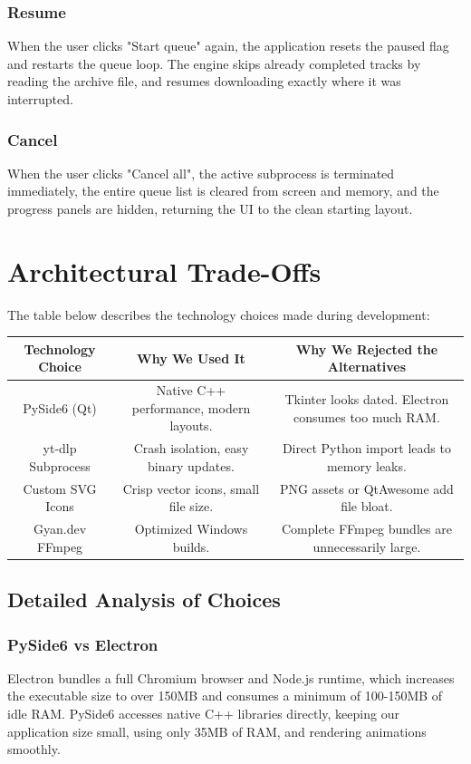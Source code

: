 \documentclass[12pt]{report}
\begin{document}
\subsection{Resume}
When the user clicks "Start queue" again, the application resets the paused flag and restarts the queue loop. The engine skips already completed tracks by reading the archive file, and resumes downloading exactly where it was interrupted.

\subsection{Cancel}
When the user clicks "Cancel all", the active subprocess is terminated immediately, the entire queue list is cleared from screen and memory, and the progress panels are hidden, returning the UI to the clean starting layout.

\newpage
\chapter{Architectural Trade-Offs}

The table below describes the technology choices made during development:

\vspace{10pt}
\renewcommand{\arraystretch}{1.5}
\begin{tabularx}{\textwidth}{|C|C|C|}
\hline
\textbf{Technology Choice} & \textbf{Why We Used It} & \textbf{Why We Rejected the Alternatives} \\ \hline
PySide6 (Qt) & Native C++ performance, modern layouts. & Tkinter looks dated. Electron consumes too much RAM. \\ \hline
yt-dlp Subprocess & Crash isolation, easy binary updates. & Direct Python import leads to memory leaks. \\ \hline
Custom SVG Icons & Crisp vector icons, small file size. & PNG assets or QtAwesome add file bloat. \\ \hline
Gyan.dev FFmpeg & Optimized Windows builds. & Complete FFmpeg bundles are unnecessarily large. \\ \hline
\end{tabularx}
\vspace{10pt}

\section{Detailed Analysis of Choices}

\subsection{PySide6 vs Electron}
Electron bundles a full Chromium browser and Node.js runtime, which increases the executable size to over 150MB and consumes a minimum of 100-150MB of idle RAM. PySide6 accesses native C++ libraries directly, keeping our application size small, using only 35MB of RAM, and rendering animations smoothly.
\end{document}
